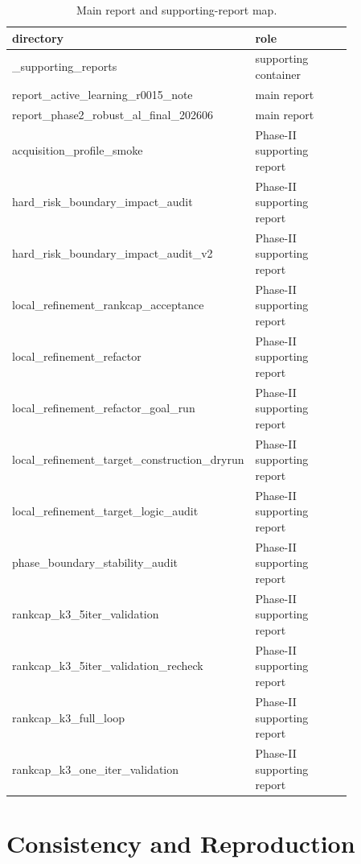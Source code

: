 \documentclass[11pt]{article}
\begin{document}
\begin{table}[H]
\centering
\small
\begin{tabular}{@{}p{0.48\linewidth}p{0.36\linewidth}@{}}
\toprule
directory & role \\
\midrule
\_supporting\_reports & supporting container \\
report\_active\_learning\_r0015\_note & main report \\
report\_phase2\_robust\_al\_final\_202606 & main report \\
acquisition\_profile\_smoke & Phase-II supporting report \\
hard\_risk\_boundary\_impact\_audit & Phase-II supporting report \\
hard\_risk\_boundary\_impact\_audit\_v2 & Phase-II supporting report \\
local\_refinement\_rankcap\_acceptance & Phase-II supporting report \\
local\_refinement\_refactor & Phase-II supporting report \\
local\_refinement\_refactor\_goal\_run & Phase-II supporting report \\
local\_refinement\_target\_construction\_dryrun & Phase-II supporting report \\
local\_refinement\_target\_logic\_audit & Phase-II supporting report \\
phase\_boundary\_stability\_audit & Phase-II supporting report \\
rankcap\_k3\_5iter\_validation & Phase-II supporting report \\
rankcap\_k3\_5iter\_validation\_recheck & Phase-II supporting report \\
rankcap\_k3\_full\_loop & Phase-II supporting report \\
rankcap\_k3\_one\_iter\_validation & Phase-II supporting report \\
\bottomrule
\end{tabular}
\caption{Main report and supporting-report map.}
\end{table}

\section{Consistency and Reproduction}
\end{document}
